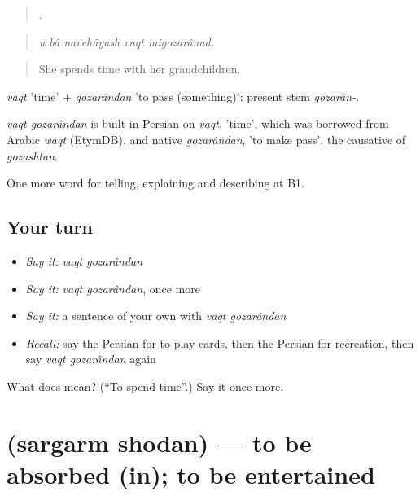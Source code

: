 \begin{quote}
     .
\end{quote}

\begin{quote}
\emph{u bâ navehâyash vaqt migozarânad.}
\end{quote}

\begin{quote}
She spends time with her grandchildren.
\end{quote}

\emph{vaqt} 'time' + \emph{gozarândan} 'to pass (something)'; present stem \emph{gozarân-}.

\begin{cousinweb}
\emph{vaqt gozarândan} is built in Persian on \emph{vaqt}, 'time', which was borrowed from Arabic \emph{waqt} (EtymDB), and native \emph{gozarândan}, 'to make pass', the causative of \emph{gozashtan}.
\end{cousinweb}

\begin{grammarlens}[title={What you've built}]
One more word for telling, explaining and describing at B1.
\end{grammarlens}

\subsection*{Your turn}
\begin{itemize}
\raggedright
  \item \emph{Say it:} \emph{vaqt gozarândan}
  \item \emph{Say it:} \emph{vaqt gozarândan}, once more
  \item \emph{Say it:} a sentence of your own with \emph{vaqt gozarândan}
  \item \emph{Recall:} say the Persian for to play cards, then the Persian for recreation, then say \emph{vaqt gozarândan} again
\end{itemize}

\begin{tcolorbox}[breakable,colback=teal!4,colframe=teal!35!black,title={Before you move on}]
What does   mean? (\textquotedblleft{}To spend time\textquotedblright{}.) Say it once more.
\end{tcolorbox}
\section[\texorpdfstring{\fa{سرگرم} \fa{شدن} (sargarm shodan)}{سرگرم شدن (sargarm shodan)}]{  (sargarm shodan) — to be absorbed (in); to be entertained}


